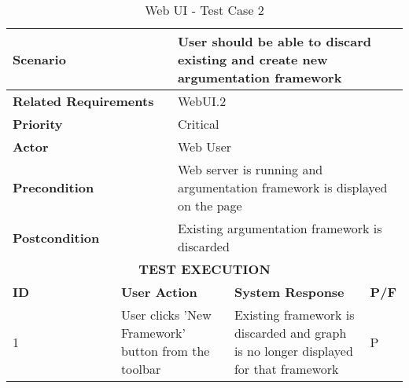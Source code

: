 \begin{longtable}[c]{p{}|p{}|p{}|p{}|p{}}
	\caption{Web UI - Test Case 2}
	\label{table:testcase2} \\
	\hline
	\multicolumn{2}{p{0.3\textwidth}}{\textbf{Scenario}} & \multicolumn{3}{p{0.6\textwidth}}{User should be able to discard existing and create new argumentation framework} \\ 
	\hline
	\endfirsthead
	\endhead
	\multicolumn{2}{p{0.3\textwidth}}{\textbf{Related Requirements}} & \multicolumn{3}{p{0.6\textwidth}}{WebUI.2} \\ 
	\hline
	\multicolumn{2}{p{0.3\textwidth}}{\textbf{Priority}} & \multicolumn{3}{p{0.6\textwidth}}{Critical} \\ 
	\hline
	\multicolumn{2}{p{0.3\textwidth}}{\textbf{Actor}} & \multicolumn{3}{p{0.6\textwidth}}{Web User} \\ 
	\hline
	\multicolumn{2}{p{0.3\textwidth}}{\textbf{Precondition}} & \multicolumn{3}{p{0.6\textwidth}}{Web server is running and argumentation framework is displayed on the page} \\ 
	\hline
	\multicolumn{2}{p{0.3\textwidth}}{\textbf{Postcondition}} & \multicolumn{3}{p{0.6\textwidth}}{Existing argumentation framework is discarded} \\ 
	\hline
	\multicolumn{5}{c}{\cellcolor{grey}\textbf{TEST EXECUTION}} \\ 
	\hline
	\textbf{ID} & \multicolumn{2}{|p{0.4\textwidth}|}{\textbf{User Action}} & \textbf{System Response} & \textbf{P/F} \\ 
	\hline
	1 & \multicolumn{2}{|p{0.4\textwidth}|}{User clicks 'New Framework' button from the toolbar} & Existing framework is discarded and graph is no longer displayed for that framework & P \\ 
	\hline
\end{longtable}

